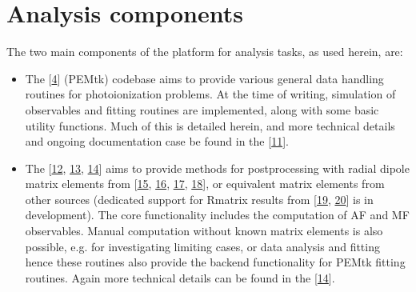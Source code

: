 \documentclass[letterpaper,table,10pt,english]{jupyterBook}
\begin{document}
\section{Analysis components}
\label{\detokenize{part1/platform_intro_071122:analysis-components}}\label{\detokenize{part1/platform_intro_071122:sect-platform-analysis}}
\sphinxAtStartPar
The two main components of the platform for analysis tasks, as used herein, are:
\begin{itemize}
\item {} 
\sphinxAtStartPar
The  {[}\hyperlink{cite.backmatter/bibliography:id618}{4}{]} (PEMtk) codebase aims to provide various general data handling routines for photoionization problems. At the time of writing, simulation of observables and fitting routines are implemented, along with some basic utility functions.
Much of this is detailed herein, and more technical details and ongoing documentation case be found in the  {[}\hyperlink{cite.backmatter/bibliography:id617}{11}{]}.

\item {} 
\sphinxAtStartPar
The  {[}\hyperlink{cite.backmatter/bibliography:id605}{12}, \hyperlink{cite.backmatter/bibliography:id547}{13}, \hyperlink{cite.backmatter/bibliography:id545}{14}{]} aims to provide methods for post\sphinxhyphen{}processing with  radial dipole matrix
elements from  {[}\hyperlink{cite.backmatter/bibliography:id693}{15}, \hyperlink{cite.backmatter/bibliography:id567}{16}, \hyperlink{cite.backmatter/bibliography:id725}{17}, \hyperlink{cite.backmatter/bibliography:id696}{18}{]}, or equivalent matrix elements from other sources (dedicated support for R\sphinxhyphen{}matrix results from  {[}\hyperlink{cite.backmatter/bibliography:id486}{19}, \hyperlink{cite.backmatter/bibliography:id771}{20}{]} is in development).
The core functionality includes the computation of AF and MF observables. Manual computation without known matrix elements is also possible, e.g. for investigating
limiting cases, or data analysis and fitting \sphinxhyphen{} hence these routines also provide the backend functionality for PEMtk fitting routines. Again more technical details can be found in the  {[}\hyperlink{cite.backmatter/bibliography:id545}{14}{]}.

\end{itemize}
\end{document}
